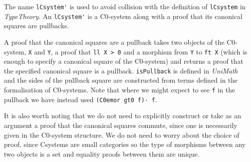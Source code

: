 The name \lstinline|lCsystem'| is used to avoid collision with the definition of
\lstinline|lCsystem| in \textit{TypeTheory}. An \lstinline|lCsystem'| is a
C0-system along with a proof that its canonical squares are pullbacks.

A proof that the canonical squares are a pullback takes two objects of the
C0-system, \lstinline|X| and \lstinline|Y|, a proof that \lstinline|ll X > 0|
and a morphism from \lstinline|Y| to \lstinline|ft X| (which is enough to
specify a canonical square of the C0-system) and returns a proof that the
specified canonical square is a pullback. \lstinline|isPullback| is defined in
\textit{UniMath} and the sides of the pullback square are constructed from terms
defined in the formalisation of C0-systems. Note that where we might expect to
see \lstinline|f| in the pullback we have instead used 
\lstinline|(C0emor gt0 f)· f|.

It is also worth noting that we do not need to explicitly construct or take as
an argument a proof that the canonical squares commute, since one is
necessarily given in the C0\nobreakdash-system structure. We do not need to
worry about the choice of proof, since Csystems are small categories so the type
of morphisms between any two objects is a set and equality proofs between them
are unique.
